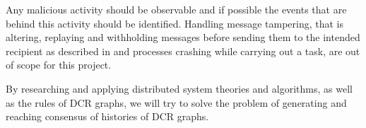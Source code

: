 	Any malicious activity should be observable and if possible the events that are behind this activity should be identified. Handling message tampering, that is altering, replaying and withholding messages before sending them to the intended recipient as described in \cite{Coulouris:2011:DSC:2029110:chapter2} and processes crashing while carrying out a task, are out of scope for this project.

	\newpar By researching and applying distributed system theories and algorithms, as well as the rules of DCR graphs, we will try to solve the problem of generating and reaching consensus of histories of DCR graphs.